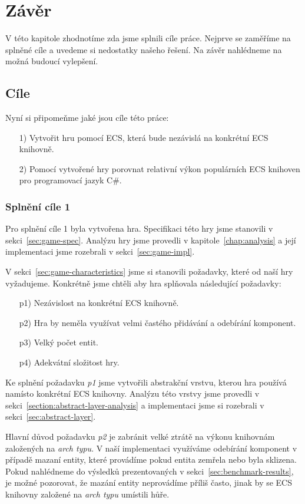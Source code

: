 \chapter{Závěr}
V této kapitole zhodnotíme zda jsme splnili cíle práce. Nejprve se zaměříme na splněné cíle a uvedeme si nedostatky našeho řešení. Na závěr nahlédneme na možná budoucí vylepšení.

\section{Cíle}
Nyní si připomeňme jaké jsou cíle této práce:

\begin{enumerate}
    \item[1)] Vytvořit hru pomocí ECS, která bude nezávislá na konkrétní ECS knihovně.
    \item[2)] Pomocí vytvořené hry porovnat relativní výkon populárních ECS knihoven pro programovací jazyk C\#.
\end{enumerate}

\subsection{Splnění cíle 1}
Pro splnění cíle 1 byla vytvořena hra. Specifikaci této hry jsme stanovili v sekci~\ref{sec:game-spec}. Analýzu hry jsme provedli v kapitole~\ref{chap:analysis} a její implementaci jsme rozebrali v sekci~\ref{sec:game-impl}.

V sekci~\ref{sec:game-characteristics} jsme si stanovili požadavky, které od naší hry vyžadujeme. Konkrétně jsme chtěli aby hra splňovala následující požadavky:

\begin{enumerate}
    \item[p1)] Nezávislost na konkrétní ECS knihovně.
    \item[p2)] Hra by neměla využívat velmi častého přidávání a odebírání komponent.
    \item[p3)] Velký počet entit.
    \item[p4)] Adekvátní složitost hry.
\end{enumerate}

Ke splnění požadavku \textit{p1} jsme vytvořili abstrakční vrstvu, kterou hra používá namísto konkrétní ECS knihovny. Analýzu této vrstvy jsme provedli v sekci~\ref{section:abstract-layer-analysis} a implementaci jsme si rozebrali v sekci~\ref{sec:abstract-layer}.

Hlavní důvod požadavku \textit{p2} je zabránit velké ztrátě na výkonu knihovnám založených na \textit{arch typu}. V naší implementaci využíváme odebírání komponent v případě mazaní entity, které provádíme pokud entita zemřela nebo byla sklizena. Pokud nahlédneme do výsledků prezentovaných v sekci~\ref{sec:benchmark-results}, je možné pozorovat, že mazání entity neprovádíme příliš často, jinak by se ECS knihovny založené na \textit{arch typu} umístili hůře.


